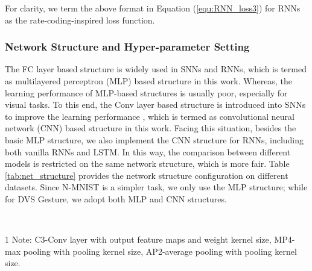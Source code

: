 \documentclass[journal,10pt,twocolumn]{IEEETran}
\begin{document}
For clarity, we term the above format in Equation (\ref{equ:RNN_loss3}) for RNNs as the rate-coding-inspired loss function.


\bigskip
\subsubsection{Network Structure and Hyper-parameter Setting}\quad

The FC layer based structure is widely used in SNNs and RNNs, which is termed as multilayered perceptron (MLP) based structure in this work. Whereas, the learning performance of MLP-based structures is usually poor, especially for visual tasks. To this end, the Conv layer based structure is introduced into SNNs to improve the learning performance \cite{wu2019direct}, which is termed as convolutional neural network (CNN) based structure in this work. Facing this situation, besides the basic MLP structure, we also implement the CNN structure for RNNs, including both vanilla RNNs and LSTM. In this way, the comparison between different models is restricted on the same network structure, which is more fair. Table \ref{tab:net_structure} provides the network structure configuration on different datasets. Since N-MNIST is a simpler task, we only use the MLP structure; while for DVS Gesture, we adopt both MLP and CNN structures.

\begin{table}[!htbp]
\caption{Network structure configuration.}
\label{tab:net_structure}
\vspace{2pt}
\centering
\renewcommand\arraystretch{1.3}
\\
 \begin{tablenotes}
\item[1] \footnotesize{\small Note: C3-Conv layer with  output feature maps and  weight kernel size, MP4-max pooling with  pooling kernel size, AP2-average pooling with  pooling kernel size.}
\end{tablenotes}
\end{table}
\end{document}
